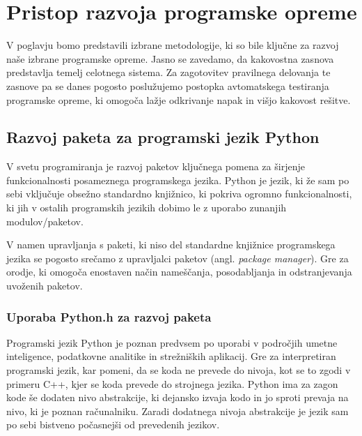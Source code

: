 \documentclass[a4paper,12pt,openright]{book}
\begin{document}
\chapter{Pristop razvoja programske opreme}
\label{ch1}

    V poglavju bomo predstavili izbrane metodologije, ki so bile ključne za razvoj naše izbrane programske opreme. Jasno se zavedamo, da kakovostna zasnova predstavlja temelj celotnega sistema. Za zagotovitev pravilnega delovanja te zasnove pa se danes pogosto poslužujemo postopka avtomatskega testiranja programske opreme, ki omogoča lažje odkrivanje napak in višjo kakovost rešitve.

    \section{Razvoj paketa za programski jezik \newline Python}

    V svetu programiranja je razvoj paketov ključnega pomena za širjenje funkcionalnosti posameznega programskega jezika. Python je jezik, ki že sam po sebi vključuje obsežno standardno knjižnico, ki pokriva ogromno funkcionalnosti, ki jih v ostalih programskih jezikih dobimo le z uporabo zunanjih modulov/paketov.

    V namen upravljanja s paketi, ki niso del standardne knjižnice programskega jezika se pogosto srečamo z upravljalci paketov (angl. \textit{package manager}). Gre za orodje, ki omogoča enostaven način nameščanja, posodabljanja in odstranjevanja uvoženih paketov.
   
    \subsection{Uporaba Python.h za razvoj paketa}
   Programski jezik Python je poznan predvsem po uporabi v področjih umetne inteligence, podatkovne analitike in strežniških aplikacij. Gre za interpretiran programski jezik, kar pomeni, da se koda ne prevede do nivoja, kot se to zgodi v primeru C++, kjer se koda prevede do strojnega jezika. Python ima za zagon kode še dodaten nivo abstrakcije, ki dejansko izvaja kodo in jo sproti prevaja na nivo, ki je poznan računalniku. Zaradi dodatnega nivoja abstrakcije je jezik sam po sebi bistveno počasnejši od prevedenih jezikov.
\end{document}
